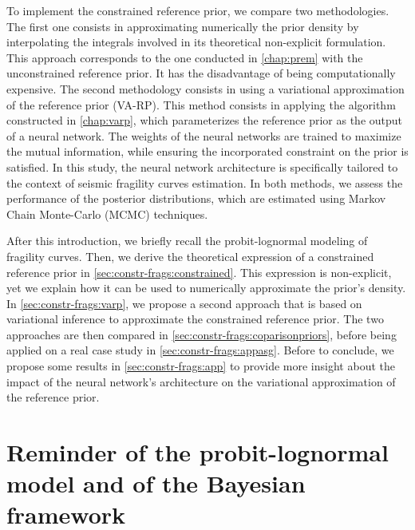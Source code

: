 To implement the constrained reference prior, we compare two methodologies.
The first one consists in approximating numerically the prior density by interpolating the integrals involved in its theoretical non-explicit formulation. %
This approach corresponds to the one conducted in   \cref{chap:prem} with the unconstrained reference prior. It has the disadvantage of being computationally expensive.
The second methodology consists in using a variational approximation of the reference prior (VA-RP).
This method consists in applying the algorithm constructed in   \cref{chap:varp}, which parameterizes the reference prior as the output of a neural network.
The weights of the neural networks are trained to maximize the mutual information, while ensuring the incorporated constraint on the prior is satisfied.
In this study, the neural network architecture is specifically tailored to the context of seismic fragility curves estimation.
In both methods, we assess the performance of the posterior distributions, which are estimated using Markov Chain Monte-Carlo (MCMC) techniques.


After this introduction, we briefly recall the probit-lognormal modeling of %
fragility curves. Then, we derive the theoretical expression of a constrained reference prior in \cref{sec:constr-frags:constrained}.
This expression is non-explicit, yet we explain how it can be used to numerically approximate the prior's density.
In \cref{sec:constr-frags:varp}, we propose a second approach that is based on variational inference to approximate the constrained reference prior.
The two approaches are then compared in \cref{sec:constr-frags:coparisonpriors}, before being applied on a real case study in \cref{sec:constr-frags:appasg}.
Before to conclude, we propose some results in \cref{sec:constr-frags:app} to provide more insight about the impact of the neural network's architecture on the variational approximation of the reference prior.








\section{Reminder of the probit-lognormal model and of the Bayesian framework}\label{sec:constr-frags:model}


